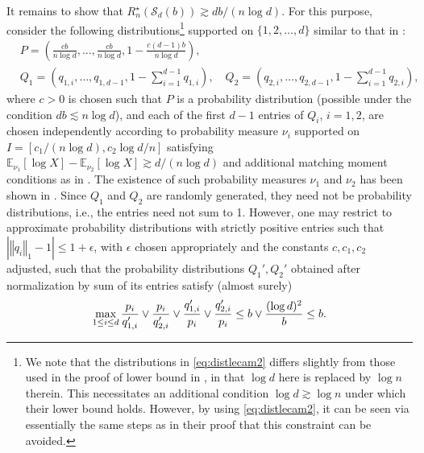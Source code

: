\documentclass[a4paper,onecolumn,11pt,accepted=2026-05-12]{quantumarticle}
\newcommand{\norm}[1]{\left\Vert#1\right\Vert}
\newcommand{\abs}[1]{\left\vert#1\right\vert}
\newcommand{\cS}{\mathcal{S}}
\newcommand{\EE}{\mathbb{E}}
\begin{document}
It remains to show that $R_n^{\star}(\cS_d(b)) \gtrsim d b/(n \log d)$. 
For this purpose, consider the following distributions\footnote{We note that the distributions in \eqref{eq:distlecam2} differs slightly from those used in the proof of lower bound in \cite[Theorem 2]{Yanjun-2020-alphadiv}, in that $\log d$ here is replaced by $\log n$ therein. This necessitates an additional condition $\log d \gtrsim \log n$ under which their lower bound holds. However, by using \eqref{eq:distlecam2}, it can be seen via essentially the same steps as in their proof that this constraint can be avoided.} supported on $\{1,2,\ldots,d\}$ similar to that in \cite[Theorem 2]{Yanjun-2020-alphadiv}:
\begin{subequations}\label{eq:distlecam2}
\begin{align}
 & P=\left(\frac{cb}{n \log d},\ldots,\frac{cb}{n \log d}, 1-\frac{c(d-1)b}{n \log d} \right),  \\
  & Q_1=\left(q_{1,i},\ldots,q_{1,d-1}, 1-\sum_{i=1}^{d-1}q_{1,i}\right), \quad Q_2=\left(q_{2,i},\ldots,q_{2,d-1}, 1-\sum_{i=1}^{d-1}q_{2,i}\right), 
\end{align}
\end{subequations}
where $c>0$ is chosen such that $P$ is a probability distribution (possible under the condition $db \lesssim n \log d$), and each of the first $d-1$ entries of  $Q_i$, $i=1,2$,  are chosen independently according to probability measure $\nu_i$ supported on $I=\left[c_1/(n \log d), c_2 \log d/n \right]$ satisfying $\EE_{\nu_1}[\log X]-\EE_{\nu_2}[\log X] \gtrsim d/(n\log d)$ and additional matching moment conditions as in \cite{Yihong-Yang-2016}.  The existence of such probability measures $\nu_1$ and $\nu_2$ has been shown in \cite{Yihong-Yang-2016}. Since $Q_1$ and $Q_2$ are randomly generated, they need not be  probability distributions, i.e., the entries need not sum to 1.  However, one may restrict to approximate probability distributions with strictly positive entries such that $\abs{\norm{q_i}_1-1} \leq 1+\epsilon$, with $\epsilon$ chosen appropriately and the constants $c,c_1,c_2$ adjusted, such that the probability distributions $Q_1',Q_2'$ obtained after normalization by sum of its entries satisfy (almost surely)
\begin{align}
    \max_{1 \leq i \leq d} \frac{p_i}{q'_{1,i}} \vee \frac{p_i}{q'_{2,i}} \vee \frac{q'_{1,i}}{p_i} \vee \frac{q'_{2,i}}{p_i} \leq b \vee \frac{(\log d)^2}{b} \leq b. \notag
\end{align} 
\end{document}
